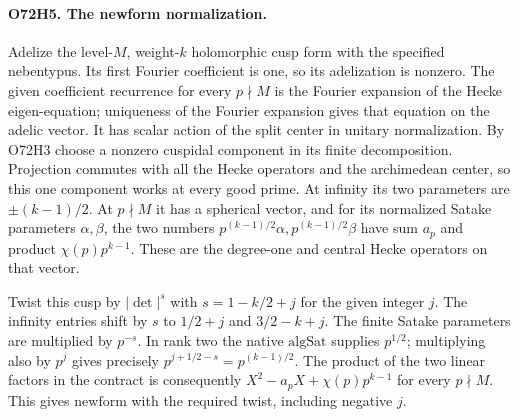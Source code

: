 \paragraph{O72H5. The newform normalization.}
Adelize the level-$M$, weight-$k$ holomorphic cusp form with the
specified nebentypus. Its first Fourier coefficient is one, so its
adelization is nonzero. The given coefficient recurrence for every
$p\nmid M$ is the Fourier expansion of the Hecke eigen-equation;
uniqueness of the Fourier expansion gives that equation on the
adelic vector. It has scalar action of the split center in unitary
normalization. By O72H3 choose a nonzero cuspidal component in its
finite decomposition. Projection commutes with all the Hecke
operators and the archimedean center, so this one component works
at every good prime. At infinity its two parameters are
$\pm(k-1)/2$. At $p\nmid M$ it has a spherical vector, and for its
normalized Satake parameters $\alpha,\beta$, the two numbers
$p^{(k-1)/2}\alpha,p^{(k-1)/2}\beta$ have sum $a_p$ and product
$\chi(p)p^{k-1}$. These are the degree-one and central Hecke
operators on that vector.

Twist this cusp by $|\det|^s$ with $s=1-k/2+j$ for the given
integer $j$. The infinity entries shift by $s$ to
$1/2+j$ and $3/2-k+j$. The finite Satake parameters are multiplied
by $p^{-s}$. In rank two the native $\mathrm{algSat}$ supplies
$p^{1/2}$; multiplying also by $p^j$ gives precisely
$p^{j+1/2-s}=p^{(k-1)/2}$. The product of the two linear factors
in the contract is consequently $X^2-a_pX+\chi(p)p^{k-1}$ for
every $p\nmid M$. This gives $\mathrm{newform}$ with the required
twist, including negative $j$.

